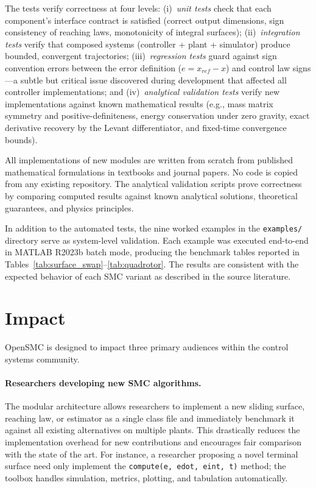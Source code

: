 \documentclass[preprint,12pt]{elsarticle}
\begin{document}
The tests verify correctness at four levels: (i)~\emph{unit tests} check that each component's interface contract is satisfied (correct output dimensions, sign consistency of reaching laws, monotonicity of integral surfaces); (ii)~\emph{integration tests} verify that composed systems (controller + plant + simulator) produce bounded, convergent trajectories; (iii)~\emph{regression tests} guard against sign convention errors between the error definition ($e = x_{ref} - x$) and control law signs---a subtle but critical issue discovered during development that affected all controller implementations; and (iv)~\emph{analytical validation tests} verify new implementations against known mathematical results (e.g., mass matrix symmetry and positive-definiteness, energy conservation under zero gravity, exact derivative recovery by the Levant differentiator, and fixed-time convergence bounds).

All implementations of new modules are written from scratch from published mathematical formulations in textbooks and journal papers. No code is copied from any existing repository. The analytical validation scripts prove correctness by comparing computed results against known analytical solutions, theoretical guarantees, and physics principles.

In addition to the automated tests, the nine worked examples in the \texttt{examples/} directory serve as system-level validation. Each example was executed end-to-end in MATLAB R2023b batch mode, producing the benchmark tables reported in Tables~\ref{tab:surface_swap}--\ref{tab:quadrotor}. The results are consistent with the expected behavior of each SMC variant as described in the source literature.


\section{Impact}
\label{sec:impact}

OpenSMC is designed to impact three primary audiences within the control systems community.

\paragraph{Researchers developing new SMC algorithms.} The modular architecture allows researchers to implement a new sliding surface, reaching law, or estimator as a single class file and immediately benchmark it against all existing alternatives on multiple plants. This drastically reduces the implementation overhead for new contributions and encourages fair comparison with the state of the art. For instance, a researcher proposing a novel terminal surface need only implement the \texttt{compute(e, edot, eint, t)} method; the toolbox handles simulation, metrics, plotting, and tabulation automatically.
\end{document}
